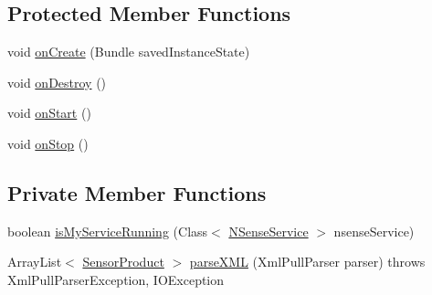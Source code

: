 \subsection*{Protected Member Functions}
\begin{DoxyCompactItemize}
\item 
void \hyperlink{classcs_1_1nsense_1_1_n_sense_activity_a9498fcc20a88df36bfc2c153145a168a}{on\-Create} (Bundle saved\-Instance\-State)
\item 
void \hyperlink{classcs_1_1nsense_1_1_n_sense_activity_a7392c5201bad2bcba25377de450ef44b}{on\-Destroy} ()
\item 
void \hyperlink{classcs_1_1nsense_1_1_n_sense_activity_ab9380d590b6620e85ed8f69955ed4899}{on\-Start} ()
\item 
void \hyperlink{classcs_1_1nsense_1_1_n_sense_activity_ab7d1da1de925b5fd60b6331ff17a2459}{on\-Stop} ()
\end{DoxyCompactItemize}
\subsection*{Private Member Functions}
\begin{DoxyCompactItemize}
\item 
boolean \hyperlink{classcs_1_1nsense_1_1_n_sense_activity_a713e6c68963c897dcdc6d5b392dc35a7}{is\-My\-Service\-Running} (Class$<$ \hyperlink{classcs_1_1nsense_1_1_n_sense_service}{N\-Sense\-Service} $>$ nsense\-Service)
\item 
Array\-List$<$ \hyperlink{classcs_1_1nsense_1_1_sensor_product}{Sensor\-Product} $>$ \hyperlink{classcs_1_1nsense_1_1_n_sense_activity_a713e4122af820d5be1ecf126ce499a5e}{parse\-X\-M\-L} (Xml\-Pull\-Parser parser)  throws Xml\-Pull\-Parser\-Exception, I\-O\-Exception 
\end{DoxyCompactItemize}
